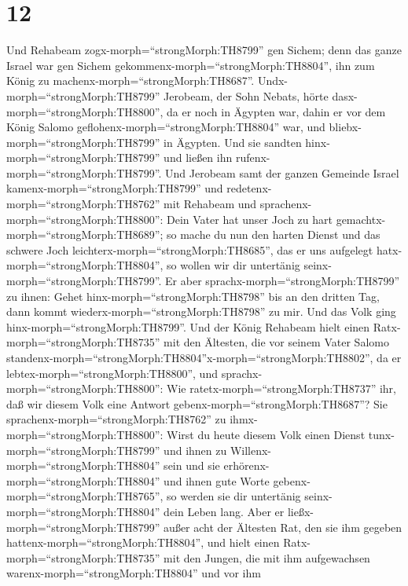 \hypertarget{section-11}{%
\section{12}\label{section-11}}

 Und Rehabeam zogx-morph=``strongMorph:TH8799'' gen Sichem;
denn das ganze Israel war gen Sichem
gekommenx-morph=``strongMorph:TH8804'', ihn zum König zu
machenx-morph=``strongMorph:TH8687''. 
Undx-morph=``strongMorph:TH8799'' Jerobeam, der Sohn Nebats, hörte
dasx-morph=``strongMorph:TH8800'', da er noch in Ägypten war, dahin er
vor dem König Salomo geflohenx-morph=``strongMorph:TH8804'' war, und
bliebx-morph=``strongMorph:TH8799'' in Ägypten.  Und sie
sandten hinx-morph=``strongMorph:TH8799'' und ließen ihn
rufenx-morph=``strongMorph:TH8799''. Und Jerobeam samt der ganzen
Gemeinde Israel kamenx-morph=``strongMorph:TH8799'' und
redetenx-morph=``strongMorph:TH8762'' mit Rehabeam und
sprachenx-morph=``strongMorph:TH8800'':  Dein Vater hat
unser Joch zu hart gemachtx-morph=``strongMorph:TH8689''; so mache du
nun den harten Dienst und das schwere Joch
leichterx-morph=``strongMorph:TH8685'', das er uns aufgelegt
hatx-morph=``strongMorph:TH8804'', so wollen wir dir untertänig
seinx-morph=``strongMorph:TH8799''.  Er aber
sprachx-morph=``strongMorph:TH8799'' zu ihnen: Gehet
hinx-morph=``strongMorph:TH8798'' bis an den dritten Tag, dann kommt
wiederx-morph=``strongMorph:TH8798'' zu mir. Und das Volk ging
hinx-morph=``strongMorph:TH8799''.  Und der König Rehabeam
hielt einen Ratx-morph=``strongMorph:TH8735'' mit den Ältesten, die vor
seinem Vater Salomo
standenx-morph=``strongMorph:TH8804''x-morph=``strongMorph:TH8802'', da
er lebtex-morph=``strongMorph:TH8800'', und
sprachx-morph=``strongMorph:TH8800'': Wie
ratetx-morph=``strongMorph:TH8737'' ihr, daß wir diesem Volk eine
Antwort gebenx-morph=``strongMorph:TH8687''?  Sie
sprachenx-morph=``strongMorph:TH8762'' zu
ihmx-morph=``strongMorph:TH8800'': Wirst du heute diesem Volk einen
Dienst tunx-morph=``strongMorph:TH8799'' und ihnen zu
Willenx-morph=``strongMorph:TH8804'' sein und sie
erhörenx-morph=``strongMorph:TH8804'' und ihnen gute Worte
gebenx-morph=``strongMorph:TH8765'', so werden sie dir untertänig
seinx-morph=``strongMorph:TH8804'' dein Leben lang.  Aber er
ließx-morph=``strongMorph:TH8799'' außer acht der Ältesten Rat, den sie
ihm gegeben hattenx-morph=``strongMorph:TH8804'', und hielt einen
Ratx-morph=``strongMorph:TH8735'' mit den Jungen, die mit ihm
aufgewachsen warenx-morph=``strongMorph:TH8804'' und vor ihm
